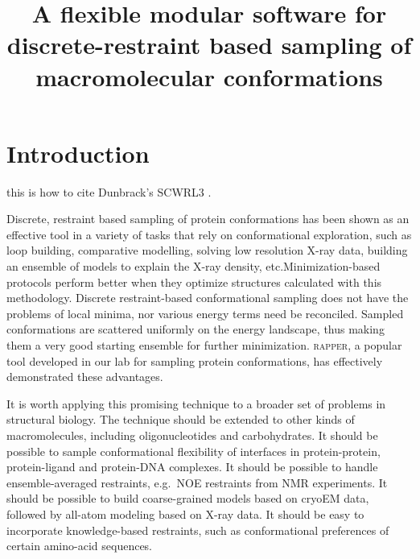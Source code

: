 \documentclass{article}[14pts]
\begin{document}

\newcommand{\phipsi}{$\phi,\psi$~}
\newcommand{\eg}{e.g.~}
\newcommand{\etc}{etc.}
\newcommand{\dfs}{\textsc{dfs}~}
\newcommand{\rapper}{\textsc{rapper}}
\newcommand{\probe}{\textsc{probe}}
\newcommand{\ie}{i.e.~}
\newcommand{\ca}{$C_\alpha$~}
\newcommand{\CA}[1]{${C_\alpha}^{#1}$~}
\newcommand{\CB}[1]{${C_\beta}^{#1}$~}
\newcommand{\C}[1]{$C^{#1}$~}
\newcommand{\N}[1]{$N^{#1}$~}
\newcommand{\cO}[1]{$O^{#1}$~}
\newcommand{\Ang}[1]{${#1}A^o$~}

\title{A flexible modular software for discrete-restraint based sampling of macromolecular conformations}

\maketitle

\section{Introduction}

this is how to cite Dunbrack's SCWRL3  \cite{scwrl3}.

Discrete, restraint based sampling of protein conformations has been shown as an effective tool in a variety of tasks that rely on conformational exploration, such as loop building, comparative modelling, solving low resolution X-ray data, building an ensemble of models to explain the X-ray density, \etc Minimization-based protocols perform better when they optimize structures calculated with this methodology. Discrete restraint-based conformational sampling does not have the problems of local minima, nor various energy terms need be reconciled. Sampled conformations are scattered uniformly on the energy landscape, thus making them a very good starting ensemble for further minimization. \rapper, a popular tool developed in our lab for sampling protein conformations, has effectively demonstrated these advantages.

It is worth applying this promising technique to a broader set of problems in structural biology. The technique should be extended to other kinds of macromolecules, including oligonucleotides and carbohydrates. It should be possible to sample conformational flexibility of interfaces in protein-protein, protein-ligand and protein-DNA complexes. It should be possible to handle ensemble-averaged restraints, \eg NOE restraints from NMR experiments. It should be possible to build coarse-grained models based on cryoEM data, followed by all-atom modeling based on X-ray data. It should be easy to incorporate knowledge-based restraints, such as conformational preferences of certain amino-acid sequences.
\end{document}

